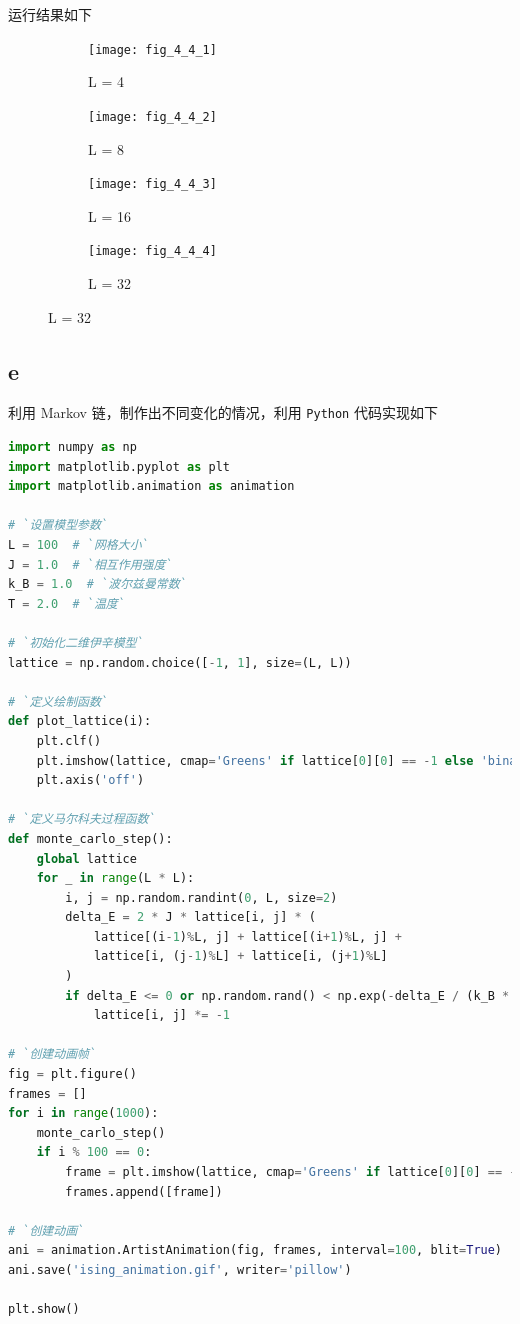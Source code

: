 \documentclass[UTF8]{ctexart}
\begin{document}
    运行结果如下
    \begin{figure}[htbp]
        \centering
        \begin{subfigure}[b]{0.42\textwidth}
            \texttt{[image: fig\_4\_4\_1]}
            \caption{L = 4}\label{fig:4.4.1}
        \end{subfigure}
        \hfill
        \begin{subfigure}[b]{0.42\textwidth}
            \texttt{[image: fig\_4\_4\_2]}
            \caption{L = 8}\label{fig:4.4.2}
        \end{subfigure}
        \centering
        \begin{subfigure}[b]{0.42\textwidth}
            \texttt{[image: fig\_4\_4\_3]}
            \caption{L = 16}\label{fig:4.4.3}
        \end{subfigure}
        \hfill
        \begin{subfigure}[b]{0.42\textwidth}
            \texttt{[image: fig\_4\_4\_4]}
            \caption{L = 32}\label{fig:4.4.4}
        \end{subfigure}\label{fig:4.4}
    \end{figure}

    \subsection{e}\label{subsec:4.5}
    利用 Markov 链，制作出不同变化的情况，利用 \texttt{Python} 代码实现如下
    \begin{lstlisting}[language=Python, breaklines = true,label={lst:4.5}]
import numpy as np
import matplotlib.pyplot as plt
import matplotlib.animation as animation

# `设置模型参数`
L = 100  # `网格大小`
J = 1.0  # `相互作用强度`
k_B = 1.0  # `波尔兹曼常数`
T = 2.0  # `温度`

# `初始化二维伊辛模型`
lattice = np.random.choice([-1, 1], size=(L, L))

# `定义绘制函数`
def plot_lattice(i):
    plt.clf()
    plt.imshow(lattice, cmap='Greens' if lattice[0][0] == -1 else 'binary')
    plt.axis('off')

# `定义马尔科夫过程函数`
def monte_carlo_step():
    global lattice
    for _ in range(L * L):
        i, j = np.random.randint(0, L, size=2)
        delta_E = 2 * J * lattice[i, j] * (
            lattice[(i-1)%L, j] + lattice[(i+1)%L, j] +
            lattice[i, (j-1)%L] + lattice[i, (j+1)%L]
        )
        if delta_E <= 0 or np.random.rand() < np.exp(-delta_E / (k_B * T)):
            lattice[i, j] *= -1

# `创建动画帧`
fig = plt.figure()
frames = []
for i in range(1000):
    monte_carlo_step()
    if i % 100 == 0:
        frame = plt.imshow(lattice, cmap='Greens' if lattice[0][0] == -1 else 'binary')
        frames.append([frame])

# `创建动画`
ani = animation.ArtistAnimation(fig, frames, interval=100, blit=True)
ani.save('ising_animation.gif', writer='pillow')

plt.show()
    \end{lstlisting}
\end{document}
